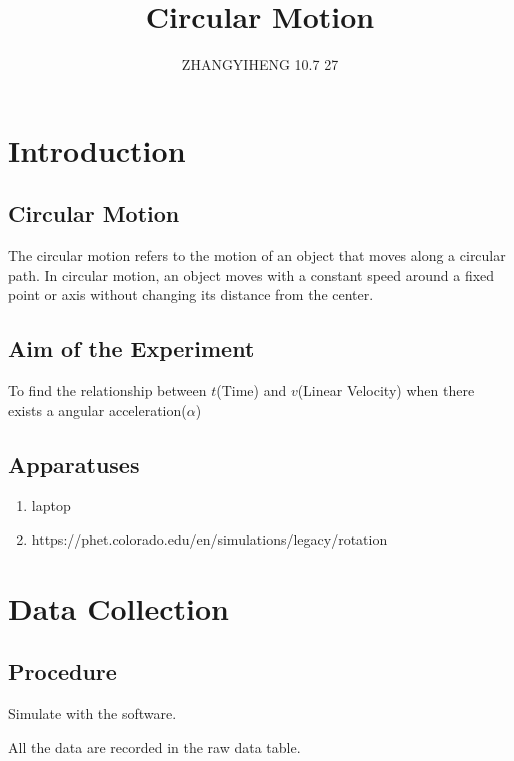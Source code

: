 \documentclass[12pt,a4paper]{article}
\author{ZHANGYIHENG 10.7 27}
\title{Circular Motion}
\date{}
\begin{document}
\setmainfont{Times New Roman}
\setsansfont{Times New Roman}
\begin{spacing}{1.25}
\maketitle
\tableofcontents
\setlength{\parindent}{4ex}
\newpage
\section{Introduction}
\subsection{Circular Motion}
The circular motion refers to the motion of an object that moves along a circular path. In circular motion, an object moves with a constant speed around a fixed point or axis without changing its distance from the center. 
\subsection{Aim of the Experiment}
To find the relationship between $ t $(Time) and $ v $(Linear Velocity) when there exists a angular acceleration($ \alpha $)
\subsection{Apparatuses}
\begin{enumerate}
    \setlength{\itemsep}{-1ex}
    \setlength{\parsep}{-1ex}
    \setlength{\topsep}{-1em}
    \item laptop
    \item https://phet.colorado.edu/en/simulations/legacy/rotation
\end{enumerate}
\section{Data Collection}
\subsection{Procedure}
Simulate with the software.\par
All the data are recorded in the raw data table.

\end{spacing}
\end{document}
